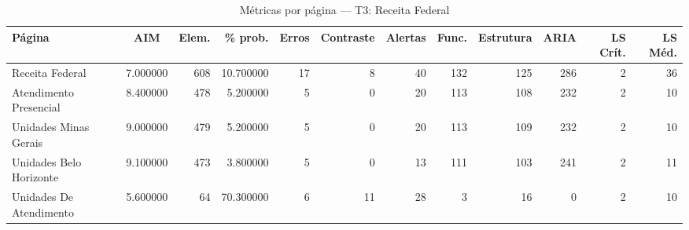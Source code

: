 \begin{table}[htbp]
  \centering
  \caption{Métricas por página — T3: Receita Federal}
  \label{tab:flow_t3_receita_federal}
  \small
  \begin{tabular}{lcrrrrrrrrrr}
\toprule
Página & AIM & Elem. & \% prob. & Erros & Contraste & Alertas & Func. & Estrutura & ARIA & LS Crít. & LS Méd. \\
\midrule
Receita Federal & 7.000000 & 608 & 10.700000 & 17 & 8 & 40 & 132 & 125 & 286 & 2 & 36 \\
Atendimento Presencial & 8.400000 & 478 & 5.200000 & 5 & 0 & 20 & 113 & 108 & 232 & 2 & 10 \\
Unidades Minas Gerais & 9.000000 & 479 & 5.200000 & 5 & 0 & 20 & 113 & 109 & 232 & 2 & 10 \\
Unidades Belo Horizonte & 9.100000 & 473 & 3.800000 & 5 & 0 & 13 & 111 & 103 & 241 & 2 & 11 \\
Unidades De Atendimento & 5.600000 & 64 & 70.300000 & 6 & 11 & 28 & 3 & 16 & 0 & 2 & 10 \\
\bottomrule
\end{tabular}
\end{table}
